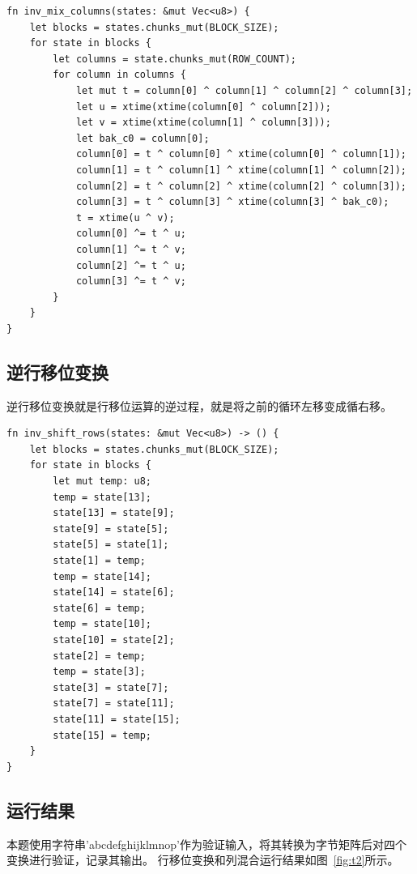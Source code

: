 \documentclass[degree=project,degree-type=project,cjk-font=noto]{thuthesis}
\begin{document}
  \begin{verbatim}
fn inv_mix_columns(states: &mut Vec<u8>) {
    let blocks = states.chunks_mut(BLOCK_SIZE);
    for state in blocks {
        let columns = state.chunks_mut(ROW_COUNT);
        for column in columns {
            let mut t = column[0] ^ column[1] ^ column[2] ^ column[3];
            let u = xtime(xtime(column[0] ^ column[2]));
            let v = xtime(xtime(column[1] ^ column[3]));
            let bak_c0 = column[0];
            column[0] = t ^ column[0] ^ xtime(column[0] ^ column[1]);
            column[1] = t ^ column[1] ^ xtime(column[1] ^ column[2]);
            column[2] = t ^ column[2] ^ xtime(column[2] ^ column[3]);
            column[3] = t ^ column[3] ^ xtime(column[3] ^ bak_c0);
            t = xtime(u ^ v);
            column[0] ^= t ^ u;
            column[1] ^= t ^ v;
            column[2] ^= t ^ u;
            column[3] ^= t ^ v;
        }
    }
}
  \end{verbatim}

\subsection{逆行移位变换}

逆行移位变换就是行移位运算的逆过程，就是将之前的循环左移变成循右移。

  \begin{verbatim}
fn inv_shift_rows(states: &mut Vec<u8>) -> () {
    let blocks = states.chunks_mut(BLOCK_SIZE);
    for state in blocks {
        let mut temp: u8;
        temp = state[13];
        state[13] = state[9];
        state[9] = state[5];
        state[5] = state[1];
        state[1] = temp;
        temp = state[14];
        state[14] = state[6];
        state[6] = temp;
        temp = state[10];
        state[10] = state[2];
        state[2] = temp;
        temp = state[3];
        state[3] = state[7];
        state[7] = state[11];
        state[11] = state[15];
        state[15] = temp;
    }
}
  \end{verbatim}

\subsection{运行结果}

本题使用字符串'abcdefghijklmnop'作为验证输入，将其转换为字节矩阵后对四个变换进行验证，记录其输出。
行移位变换和列混合运行结果如图~\ref{fig:t2}所示。
\end{document}
